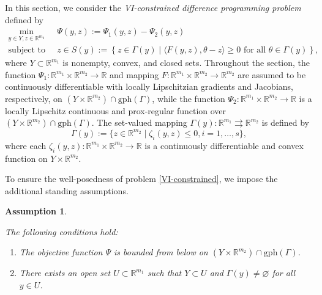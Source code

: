 \documentclass[11pt,a4paper]{article}
\newtheorem{assumption}[theorem]{Assumption}
\theoremstyle{plain}
\begin{document}
In this section, we consider the {\em VI-constrained difference programming problem} defined by
\begin{equation}\label{VI-constrained}
\begin{aligned}
\min_{ y \in Y, z \in \mathbb{R}^{m_2}}  
~~& \Psi(y, z) := \Psi_1(y,z) - \Psi_2(y,z) \\
\text{subject to } ~~~~& z \in S(y) := \left\{
z \in\Gamma(y) \mid \langle F(y, z), \theta - z \rangle \geq 0 \text{ for all } \theta \in \Gamma(y)
\right\},
\end{aligned}
\end{equation}  
where $Y \subset \mathbb{R}^{m_1}$ is nonempty, convex, and closed sets. Throughout the section, the function \( \Psi_1: \mathbb{R}^{m_1} \times \mathbb{R}^{m_2} \to \mathbb{R} \) and mapping $ F: \mathbb{R}^{m_1} \times \mathbb{R}^{m_2} \to \mathbb{R}^{m_2} $ are assumed to be continuously differentiable with locally Lipschitzian  gradients and Jacobians, respectively, on \(  \left( Y \times \mathbb{R}^{m_2} \right) \cap \mathrm{gph} (\Gamma) \), while the function \( \Psi_2: \mathbb{R}^{m_1}\times \mathbb{R}^{m_2} \to \mathbb{R} \) is a locally Lipschitz continuous and prox-regular function over \(  \left( Y \times \mathbb{R}^{m_2} \right) \cap \mathrm{gph} (\Gamma) \). The set-valued mapping $\Gamma(y) : \mathbb{R}^{m_1} \rightrightarrows \mathbb{R}^{m_2} $ is defined by
\begin{equation}\label{Gamma}
\Gamma(y) := \{z \in \mathbb{R}^{m_2} \mid \zeta_i(y,z) \le 0, i =1, \ldots,s\},
\end{equation}
where each $\zeta_i(y,z): \mathbb{R}^{m_1} \times \mathbb{R}^{m_2} \to \mathbb{R}$ is a continuously differentiable and convex function on  \( Y \times \mathbb{R}^{m_2} \).\vspace*{0.05in}

To ensure the well-posedness of problem \eqref{VI-constrained}, we impose the additional standing assumptions.

\begin{assumption}\label{assumption1} 
{\rm The following conditions hold:
\begin{enumerate}
\item[\bf(a)] The objective function $\Psi$ is bounded from below on $ \left( Y \times \mathbb{R}^{m_2} \right) \cap \mathrm{gph} (\Gamma)$.

\item[\bf(b)] There exists an open set $U\subset\mathbb{R}^{m_1}$ such that $Y \subset U$ and $\Gamma(y) \neq \varnothing$ for all $ y \in U$.
\end{enumerate}}
\end{assumption}
\end{document}
